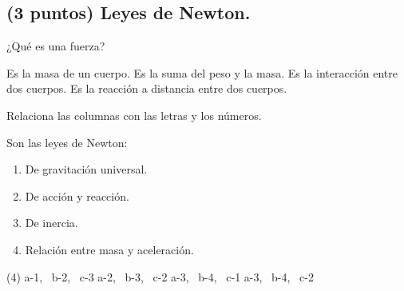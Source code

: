 \documentclass[12pt, letter]{exam}
\begin{document}
\begin{questions}
    \section{(3 puntos) Leyes de Newton.}

    \question ¿Qué es una fuerza?
     \begin{tasks}
        \task Es la masa de un cuerpo.
        \task Es la suma del peso y la masa.
        \task Es la interacción entre dos cuerpos.
        \task Es la reacción a distancia entre dos cuerpos.
    \end{tasks}
 
    \newpage

    \question Relaciona las columnas con las letras y los números.
    
    Son las leyes de Newton:
    
    \begin{minipage}[t]{0.4\linewidth}
    \end{minipage}
    \hspace{-0.5cm}
    \begin{minipage}[t]{0.5\linewidth}
        \begin{enumerate}[label=\arabic*)]
            \itemsep0em
            \item De gravitación universal.
            \item De acción y reacción.
            \item De inercia.
            \item Relación entre masa y aceleración.
        \end{enumerate}
    \end{minipage}
    \begin{tasks}(4)
        \task a-1, \, b-2, \, c-3
        \task a-2, \, b-3, \, c-2
        \task a-3, \, b-4, \, c-1
        \task a-3, \, b-4, \, c-2
    \end{tasks}
    

\end{questions}
\end{document}
